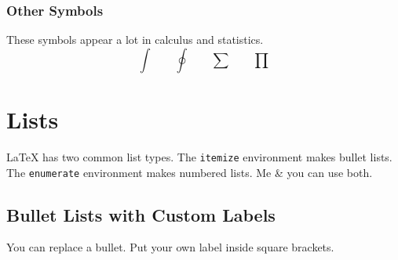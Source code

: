 \documentclass[12pt]{article}
\begin{document}
\subsubsection{Other Symbols}
These symbols appear a lot in calculus and statistics.
$$\int \qquad \oint \qquad \sum \qquad \prod$$

\section{Lists}
\LaTeX{} has two common list types. The \verb|itemize| environment makes bullet lists. The \verb|enumerate| environment makes numbered lists. Me & you can use both.

\subsection{Bullet Lists with Custom Labels}
You can replace a bullet. Put your own label inside square brackets.
\end{document}
